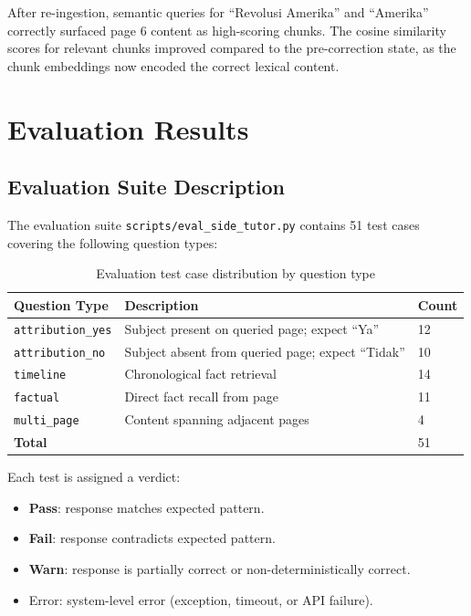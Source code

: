 \documentclass[12pt, a4paper]{report}
\newcommand{\passtext}[1]{\textcolor{passfg}{\textbf{#1}}}
\newcommand{\failtext}[1]{\textcolor{failfg}{\textbf{#1}}}
\newcommand{\warntext}[1]{\textcolor{warnfg}{\textbf{#1}}}
\newcommand{\codeinline}[1]{\texttt{#1}}
\begin{document}
After re-ingestion, semantic queries for ``Revolusi Amerika'' and ``Amerika''
correctly surfaced page 6 content as high-scoring chunks. The cosine similarity
scores for relevant chunks improved compared to the pre-correction state, as
the chunk embeddings now encoded the correct lexical content.


\chapter{Evaluation Results}

\section{Evaluation Suite Description}

The evaluation suite \codeinline{scripts/eval\_side\_tutor.py} contains 51
test cases covering the following question types:

\begin{table}[H]
  \centering
  \caption{Evaluation test case distribution by question type}
  \label{tab:eval_types}
  \begin{tabular}{lll}
    \toprule
    \textbf{Question Type} & \textbf{Description} & \textbf{Count} \\
    \midrule
    \texttt{attribution\_yes} & Subject present on queried page; expect ``Ya'' & 12 \\
    \texttt{attribution\_no}  & Subject absent from queried page; expect ``Tidak'' & 10 \\
    \texttt{timeline}         & Chronological fact retrieval & 14 \\
    \texttt{factual}          & Direct fact recall from page & 11 \\
    \texttt{multi\_page}      & Content spanning adjacent pages & 4 \\
    \midrule
    \textbf{Total}            & & 51 \\
    \bottomrule
  \end{tabular}
\end{table}

Each test is assigned a verdict:
\begin{itemize}[noitemsep]
  \item \passtext{Pass}: response matches expected pattern.
  \item \failtext{Fail}: response contradicts expected pattern.
  \item \warntext{Warn}: response is partially correct or non-deterministically
        correct.
  \item Error: system-level error (exception, timeout, or API failure).
\end{itemize}
\end{document}

